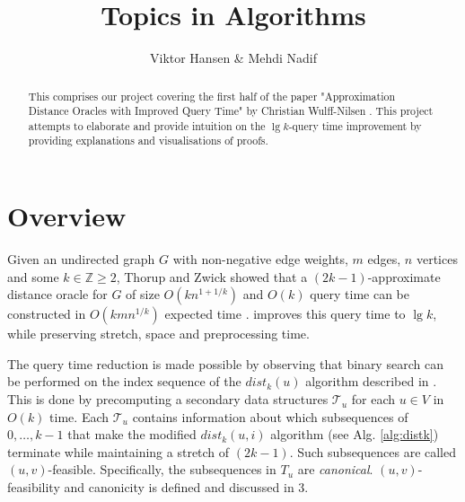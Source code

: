 \documentclass[12pt]{article}
\begin{document}
\nocite{*}


\title{Topics in Algorithms}

\author{Viktor Hansen \& Mehdi Nadif}

\maketitle

\begin{abstract}
  This comprises our project covering the first half of the paper "Approximation Distance Oracles with Improved Query Time" by Christian Wulff-Nilsen \cite{Wulff2013}. This project attempts to elaborate and provide intuition on the $\lg k$-query time improvement by providing explanations and visualisations of proofs.
\end{abstract}

\pagebreak

\section{Overview}
Given an undirected graph $G$ with non-negative edge weights, $m$ edges, $n$ vertices and some $k \in \mathbb{Z} \geq 2$, Thorup and Zwick showed that a $(2k-1)$-approximate distance oracle for $G$ of size $O(kn^{1+1/k})$ and $O(k)$ query time can be constructed in $O(kmn^{1/k})$ expected time \cite{Thorup2005}. \cite{Wulff2013} improves this query time to $\lg k$, while preserving stretch, space and preprocessing time. %

The query time reduction is made possible by observing that binary search can be performed on the index sequence of the $dist_k(u)$ algorithm described in \cite{Thorup2005}. This is done by precomputing a secondary data structures $\mathcal{T}_u$ for each $u \in V$ in $O(k)$ time. Each $\mathcal{T}_u$ contains information about which subsequences of $0, \hdots, k-1$ that make the modified $dist_k(u,i)$ algorithm (see Alg. \ref{alg:distk}) terminate while maintaining a  stretch of $(2k-1)$. Such subsequences are called $(u,v)$-feasible. Specifically, the subsequences in $T_u$ are \textit{canonical}. $(u,v)$-feasibility and canonicity is defined and discussed in 3.

\end{document}

